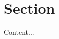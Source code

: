 \documentclass[RAIdocument%
              ]{RAIlatex}%
\begin{document}
%
%
\RAIlayoutHeaderCDChair%
%
\section*{Section}%
Content...%
%
{%
}%
%
\end{document}
